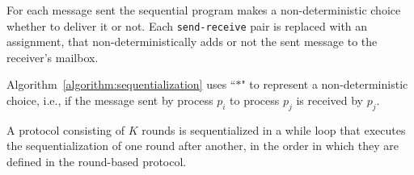 For each message sent the sequential program makes a non-deterministic choice whether to deliver it or not. 
Each \texttt{send-receive} pair is replaced with an assignment, that non-deterministically adds or not the sent message to the receiver's mailbox.

Algorithm~\ref{algorithm:sequentialization} uses ``$*$" to represent a non-deterministic choice, i.e., if the message sent by process $p_i$ to process $p_j$ is received by $p_j$. 

A protocol consisting of $K$ rounds is sequentialized in a while loop that executes the sequentialization of one round after another, in the order in which they are defined in the round-based protocol. 
